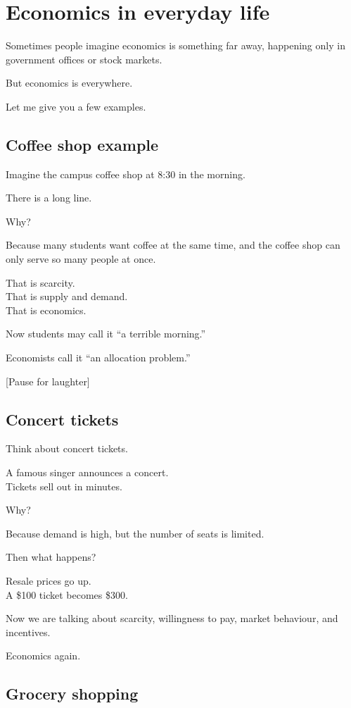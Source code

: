 \documentclass[12pt]{article}
\begin{document}
\section*{Economics in everyday life}

Sometimes people imagine economics is something far away, happening only in government offices or stock markets.

But economics is everywhere.

Let me give you a few examples.

\subsection*{Coffee shop example}

Imagine the campus coffee shop at 8:30 in the morning.

There is a long line.

Why?

Because many students want coffee at the same time, and the coffee shop can only serve so many people at once.

That is scarcity.\\
That is supply and demand.\\
That is economics.

Now students may call it “a terrible morning.”

Economists call it “an allocation problem.”

[Pause for laughter]

\subsection*{Concert tickets}

Think about concert tickets.

A famous singer announces a concert.\\
Tickets sell out in minutes.

Why?

Because demand is high, but the number of seats is limited.

Then what happens?

Resale prices go up.\\
A \$100 ticket becomes \$300.

Now we are talking about scarcity, willingness to pay, market behaviour, and incentives.

Economics again.

\subsection*{Grocery shopping}
\end{document}
